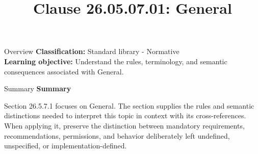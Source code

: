 \documentclass[10pt,letterpaper]{article}
\title{Clause 26.05.07.01: General}
\author{}
\date{}
\begin{document}
\maketitle
\begin{CornellOverviewBox}{Overview}
\textbf{Classification:} Standard library - Normative\\[2pt]
\textbf{Learning objective:} Understand the rules, terminology, and semantic consequences associated with General.
\end{CornellOverviewBox}\begin{CornellSummaryBox}{Summary}
{\sffamily\bfseries\color{Accent} Summary}\par\vspace{3pt}Section 26.5.7.1 focuses on General. The section supplies the rules and semantic distinctions needed to interpret this topic in context with its cross-references. When applying it, preserve the distinction between mandatory requirements, recommendations, permissions, and behavior deliberately left undefined, unspecified, or implementation-defined.
\end{CornellSummaryBox}
\end{document}
